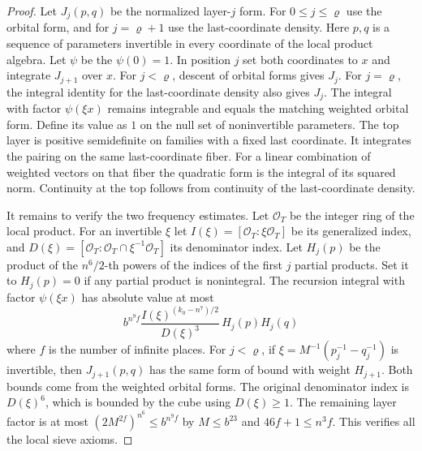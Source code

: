 \begin{proof}
Let $J_j(p,q)$ be the normalized layer-$j$ form. For $0\le j\le\varrho$ use the orbital form,
and for $j=\varrho+1$ use the last-coordinate density.
Here $p,q$ is a sequence of parameters invertible in every coordinate of the local product algebra.
Let $\psi$ be the $\psi(0)=1$.
In position $j$ set both coordinates to $x$ and integrate $J_{j+1}$ over $x$.
For $j<\varrho$, descent of orbital forms gives $J_j$.
For $j=\varrho$, the integral identity for the last-coordinate density also gives $J_j$.
The integral with factor $\psi(\xi x)$ remains integrable and equals the matching weighted orbital form.
Define its value as $1$ on the null set of noninvertible parameters.
The top layer is positive semidefinite on families with a fixed last coordinate.
It integrates the pairing on the same last-coordinate fiber.
For a linear combination of weighted vectors on that fiber the quadratic form is the integral of its squared norm.
Continuity at the top follows from continuity of the last-coordinate density.

It remains to verify the two frequency estimates. Let $\mathcal O_T$ be the integer ring of the local product.
For an invertible $\xi$ let $I(\xi)=[\mathcal O_T:\xi\mathcal O_T]$ be its generalized index,
and $D(\xi)=[\mathcal O_T:\mathcal O_T\cap\xi^{-1}\mathcal O_T]$ its denominator index.
Let $H_j(p)$ be the product of the $n^6/2$-th powers of the indices of the first $j$ partial products.
Set it to $H_j(p)=0$ if any partial product is nonintegral.
The recursion integral with factor $\psi(\xi x)$ has absolute value at most
\[
 b^{n^9 f}\frac{I(\xi)^{(k_0-n^7)/2}}{D(\xi)^3}\,
     H_j(p)H_j(q)
\]
where $f$ is the number of infinite places.
For $j<\varrho$, if $\xi=M^{-1}(p_j^{-1}-q_j^{-1})$ is invertible,
then $J_{j+1}(p,q)$ has the same form of bound with weight $H_{j+1}$.
Both bounds come from the weighted orbital forms. The original denominator index is $D(\xi)^6$,
which is bounded by the cube using $D(\xi)\ge1$.
The remaining layer factor is at most
$(2M^{2f})^{n^6}\le b^{n^9f}$ by $M\le b^{23}$ and $46f+1\le n^3f$.
This verifies all the local sieve axioms.
\end{proof}

